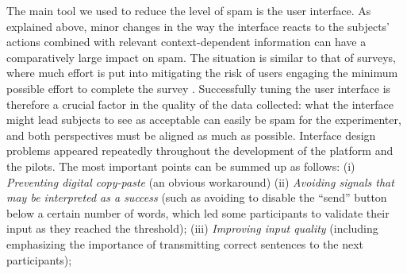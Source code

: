 The main tool we used to reduce the level of spam is the user interface.
As explained above, minor changes in the way the interface reacts to the
subjects' actions combined with relevant context-dependent information
can have a comparatively large impact on spam.
The situation is similar to that of surveys, where much effort is put
into mitigating the risk of users engaging the minimum possible effort
to complete the survey \autocite{krosnick_threat_2000}. Successfully
tuning the user interface is therefore a crucial factor in the quality
of the data collected: what the interface might lead subjects to see as
acceptable can easily be spam for the experimenter, and both
perspectives must be aligned as much as possible. Interface design
problems appeared repeatedly throughout the development of the platform
and the pilots. The most important points can be summed up as follows: 
(i) 
  \emph{Preventing digital copy-paste} (an obvious workaround)
(ii)
  \emph{Avoiding signals that may be interpreted as a success} (such as avoiding to disable the ``send'' button below a certain number of words, which led some participants to validate their input as they reached the threshold);
(iii)
  \emph{Improving input quality} (including emphasizing the importance of transmitting correct sentences to the next participants); 
